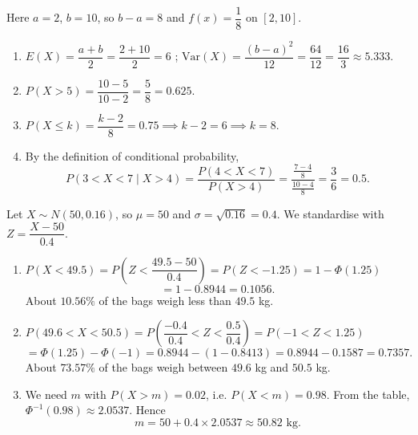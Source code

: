 \documentclass[11pt]{article}
\begin{document}
\begin{corrige}
Here $a = 2$, $b = 10$, so $b - a = 8$ and $f(x) = \dfrac{1}{8}$ on $[2,10]$.

\begin{enumerate}
\item $E(X) = \dfrac{a+b}{2} = \dfrac{2+10}{2} = \boxed{6}$ ; \quad $\mathrm{Var}(X) = \dfrac{(b-a)^2}{12} = \dfrac{64}{12} = \boxed{\dfrac{16}{3} \approx 5.333}$.

\item $P(X > 5) = \dfrac{10 - 5}{10 - 2} = \dfrac{5}{8} = \boxed{0.625}$.

\item $P(X \le k) = \dfrac{k - 2}{8} = 0.75 \implies k - 2 = 6 \implies \boxed{k = 8}$.

\item By the definition of conditional probability,
\[
P(3 < X < 7 \mid X > 4) = \frac{P(4 < X < 7)}{P(X > 4)} = \frac{\frac{7-4}{8}}{\frac{10-4}{8}} = \frac{3}{6} = \boxed{0.5}.
\]
\end{enumerate}
\end{corrige}

\begin{corrige}
Let $X \sim N(50, 0.16)$, so $\mu = 50$ and $\sigma = \sqrt{0.16} = 0.4$. We standardise with $Z = \dfrac{X - 50}{0.4}$.

\begin{enumerate}
\item $P(X < 49.5) = P\!\left(Z < \dfrac{49.5 - 50}{0.4}\right) = P(Z < -1.25) = 1 - \Phi(1.25)$
\[
= 1 - 0.8944 = 0.1056.
\]
About $\boxed{10.56\%}$ of the bags weigh less than $49.5$ kg.

\item $P(49.6 < X < 50.5) = P\!\left(\dfrac{-0.4}{0.4} < Z < \dfrac{0.5}{0.4}\right) = P(-1 < Z < 1.25)$
\[
= \Phi(1.25) - \Phi(-1) = 0.8944 - (1 - 0.8413) = 0.8944 - 0.1587 = 0.7357.
\]
About $\boxed{73.57\%}$ of the bags weigh between $49.6$ kg and $50.5$ kg.

\item We need $m$ with $P(X > m) = 0.02$, i.e. $P(X < m) = 0.98$. From the table, $\Phi^{-1}(0.98) \approx 2.0537$. Hence
\[
m = 50 + 0.4 \times 2.0537 \approx \boxed{50.82 \text{ kg}}.
\]
\end{enumerate}
\end{corrige}
\end{document}
